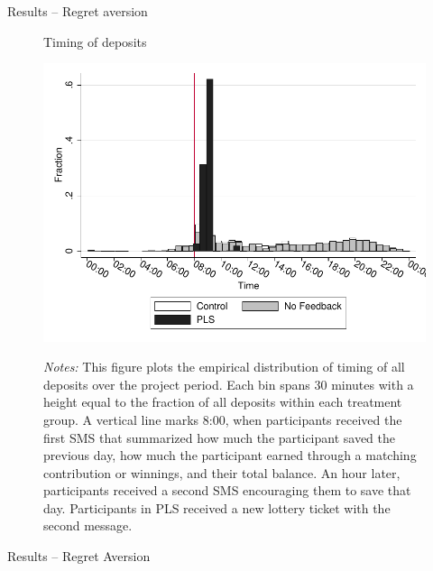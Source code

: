\documentclass[aspectratio=169]{beamer}
\begin{document}
\begin{frame}{Results -- Regret aversion}

		\begin{figure}[ht]
		\centering
		\caption{Timing of deposits}
		\includegraphics[height=0.8\textheight]{../../figures/hist-deposits.pdf}
		\label{fig:hist-deposits}
		\caption*{\footnotesize \emph{Notes:} This figure plots the empirical distribution of timing of all deposits over the project period. Each bin spans 30 minutes with a height equal to the fraction of all deposits within each treatment group. A vertical line marks 8:00, when participants received the first SMS that summarized how much the participant saved the previous day, how much the participant earned through a matching contribution or winnings, and their total balance. An hour later, participants received a second SMS encouraging them to save that day. Participants in PLS received a new lottery ticket with the second message.}
		\end{figure}

\end{frame}

\begin{frame}{Results -- Regret Aversion}
	
	
	




\end{frame}
\end{document}

